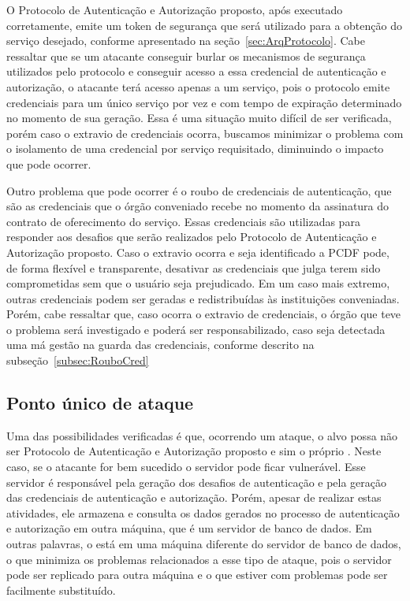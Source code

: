 O Protocolo de Autenticação e Autorização proposto, após executado corretamente, emite um token de segurança que será utilizado para a obtenção do serviço desejado, conforme apresentado na seção~\ref{sec:ArqProtocolo}. Cabe ressaltar que se um atacante conseguir burlar os mecanismos de segurança utilizados pelo protocolo e conseguir acesso a essa credencial de autenticação e autorização, o atacante terá acesso apenas a um serviço, pois o protocolo emite credenciais para um único serviço por vez e com tempo de expiração determinado no momento de sua geração. Essa é uma situação muito difícil de ser verificada, porém caso o extravio de credenciais ocorra, buscamos minimizar o problema com o isolamento de uma credencial por serviço requisitado, diminuindo o impacto que pode ocorrer.

Outro problema que pode ocorrer é o roubo de credenciais de autenticação, que são as credenciais que o órgão conveniado recebe no momento da assinatura do contrato de oferecimento do serviço. Essas credenciais são utilizadas para responder aos desafios que serão realizados pelo Protocolo de Autenticação e Autorização proposto. Caso o extravio ocorra e seja identificado a PCDF pode, de forma flexível e transparente, desativar as credenciais que julga terem sido comprometidas sem que o usuário seja prejudicado.
Em um caso mais extremo, outras credenciais podem ser geradas e redistribuídas \`{a}s institui\c c\~{o}es conveniadas. Porém, cabe ressaltar que, caso ocorra o extravio de credenciais, o órgão que teve o problema será investigado e poderá ser responsabilizado, caso seja detectada uma má gestão na guarda das credenciais, conforme descrito na subseção~\ref{subsec:RouboCred}


\subsection{Ponto único de ataque}

Uma das possibilidades verificadas é que, ocorrendo um ataque, o alvo possa não ser Protocolo de Autenticação e Autorização proposto e sim o próprio \servidorAA.
Neste caso, se o atacante for bem sucedido o servidor pode ficar vulnerável. Esse servidor é responsável pela geração dos desafios de autenticação e pela geração das credenciais de autenticação e autorização. Porém, apesar de realizar estas atividades, ele armazena e consulta os dados gerados no processo de autenticação e autorização em outra máquina, que é um servidor de banco de dados. Em outras palavras, o \servidorAA está em uma máquina diferente do servidor de banco de dados, o que minimiza os problemas relacionados a esse tipo de ataque, pois o servidor pode ser replicado para outra máquina e o que estiver com problemas pode ser facilmente substituído.

